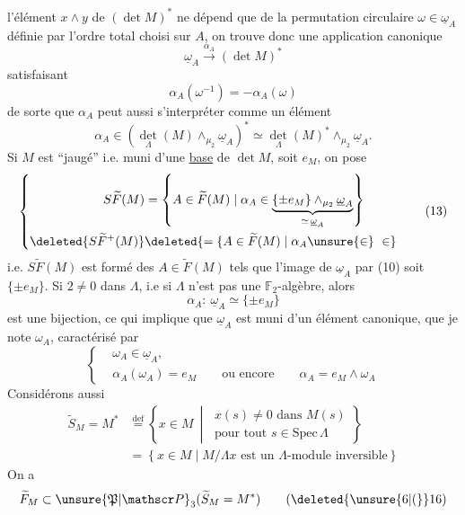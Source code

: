 l'élément $x\wedge y$ de $(\det M)^*$ ne dépend que de la permutation circulaire $\omega\in\underline{\omega}_A$ définie par l'ordre total choisi sur $A$, on trouve donc une application canonique
\[
\underline{\omega}_A\xrightarrow{\alpha_A}(\det M)^*\tag*{(10)}
\]
satisfaisant
\[
\alpha_A(\omega^{-1})=-\alpha_A(\omega)\tag*{(11)}
\]
de sorte que $\alpha_A$ peut aussi s'interpréter comme un élément
\[
\alpha_A\in\left(\det_{\Lambda}(M)\wedge_{\mu_2}\underline{\omega}_A\right)^*\simeq
\det_{\Lambda}(M)^*\wedge_{\mu_2}\underline{\omega}_A.\tag*{(12)}
\]
 Si $M$ est ``jaugé'' i.e. muni d'une \uline{base} de $\det M$, soit $e_M$, on pose
\[
\left\{\begin{aligned}
S\widetilde F(M)&=\left\{A\in\widetilde F(M)\mid\alpha_A\in
\underbrace{\{\pm e_M\}\wedge_{\mu_2}\underline{\omega}_A}_{\simeq\,\underline{\omega}_A}\right\}\\
\deleted{S\widetilde F^+(M)}&\deleted{=\{A\in\widetilde F(M)\mid\alpha_A\unsure{\in}\ \in}
\end{aligned}\right.\tag*{(13)}
\]
i.e. $S\widetilde F(M)$ est formé des $A\in\widetilde F(M)$ tels que l'image de $\underline{\omega}_A$ par (10) soit $\{\pm e_M\}$. Si $2\ne0$ dans $\Lambda$, i.e si $\Lambda$ n'est pas une $\mathbb F_2$-algèbre, alors 
\[
\alpha_A:\ \underline{\omega}_A\simeq\{\pm e_M\}
\]
est une bijection, ce qui implique que
$\underline{\omega}_A$ est muni d'un élément canonique, que je note $\omega_A$, caractérisé par
\[
\left\{\begin{aligned}
&\omega_A\in\underline{\omega}_A,\\
&\alpha_A(\omega_A)=e_M\qquad\text{ou encore}\qquad\alpha_A=e_M\wedge\omega_A
\end{aligned}\right.\tag*{(14)}
\]
Considérons aussi
\[
\begin{aligned}
\widetilde S_M=M^*&\overset{\mathrm{def}}{=}\left\{x\in M\ \middle|\ \begin{gathered}
x(s)\ne0\text{ dans }M(s)\\ \text{pour tout }s\in\mathrm{Spec}\,\Lambda\end{gathered}\right\}\\
&=\left\{x\in M\mid M/\Lambda x\text{ est un }\Lambda\text{-module inversible}\right\}
\end{aligned}\tag*{(15)}
\]
On a  
\[
\widetilde F_M\subset\unsure{\mathfrak P|\mathscr P}_3(\widetilde S_M=M^*)\tag*{(\deleted{\unsure{6|(}}16)}
\]
